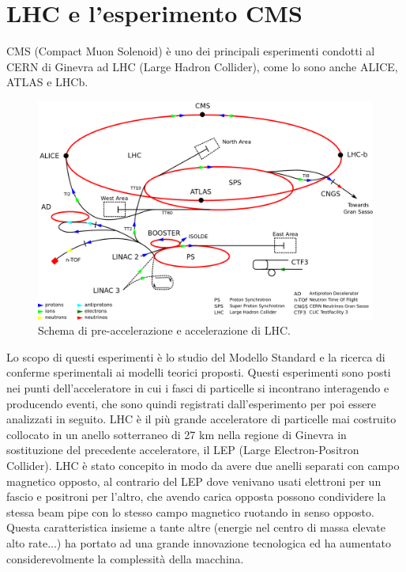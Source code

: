 \section{LHC e l'esperimento CMS}
CMS (Compact Muon Solenoid) è uno dei principali esperimenti condotti al CERN di Ginevra ad LHC (Large Hadron Collider), come lo sono anche ALICE, ATLAS e  LHCb. 

\begin{figure}
\centering
\includegraphics[scale=0.25]{Immagini/LHC}
\caption{Schema di pre-accelerazione e accelerazione di LHC.}
\label{fig:LHC}
\end{figure}

Lo scopo di questi esperimenti è lo studio del Modello Standard e la ricerca di conferme sperimentali ai modelli teorici proposti. Questi esperimenti sono posti nei punti dell'acceleratore in cui i fasci di particelle si  incontrano interagendo e producendo eventi, che sono quindi registrati dall'esperimento per poi essere analizzati in seguito.
LHC è il più grande acceleratore di particelle mai costruito collocato in un anello sotterraneo di 27 km nella regione di Ginevra in sostituzione del precedente acceleratore, il LEP (Large Electron-Positron Collider).
LHC è stato concepito in modo da avere due anelli separati con campo magnetico opposto, al contrario del LEP dove venivano usati elettroni per un fascio e positroni per l'altro, che avendo carica opposta possono condividere la stessa beam pipe con lo stesso campo magnetico ruotando in senso opposto. 
Questa caratteristica insieme a tante altre (energie nel centro di massa elevate alto rate...) ha portato ad una grande innovazione tecnologica ed ha aumentato considerevolmente la complessità della macchina. 

